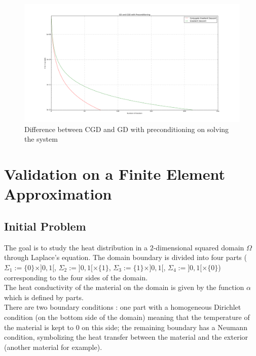 \documentclass[a4paper]{report}
\begin{document}
\begin{figure}[H]
\begin{center}
\includegraphics[scale=0.20]{cgd_gd.png}\caption{Difference between CGD and GD with preconditioning on solving the system}
\end{center}
\end{figure}
\part{Validation on a Finite Element Approximation}

\chapter{Initial Problem}
The goal is to study the heat distribution in a $2$-dimensional squared domain $\Omega$ through Laplace's equation. The domain boundary is divided into four parts ($\Sigma_1:=\{0\}\times]0,1[$, $\Sigma_2:=]0,1[ \times \{1\}$, $\Sigma_3:=\{1\} \times ]0,1[$, $ \Sigma_4:=]0,1[\times \{0\}$)  corresponding to the four sides of the domain.\\
The heat conductivity of the material on the domain is given by the function $\alpha$ which is defined by parts.\\
There are two boundary conditions : one part with a homogeneous Dirichlet condition (on the bottom side of the domain) meaning that the temperature of the material is kept to $0$ on this side; the remaining boundary has a  Neumann condition, symbolizing the heat transfer between the material and the exterior (another material for example).
\end{document}
